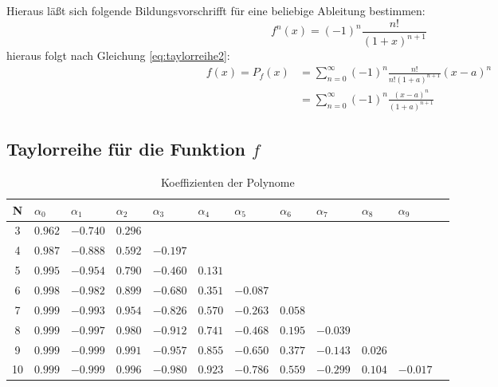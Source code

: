 \documentclass{beamer}
\begin{document}
  \begin{frame}
    Hieraus läßt sich folgende Bildungsvorschrifft für eine beliebige Ableitung bestimmen:
    \begin{equation}
        f^n\left(x\right) = \left(-1\right)^n \frac{n!}{\left(1+x\right)^{n+1}}
    \end{equation}
    hieraus folgt nach Gleichung \ref{eq:taylorreihe2}:
    \begin{align}
        f\left(x\right)  =  P_f\left(x\right) 
                        &= \sum_{n=0}^{\infty} \left(-1\right)^n
                            \frac{n!}{n!\left(1+a\right)^{n+1}}\left(x-a\right)^n\\
                        &=  \sum_{n=0}^{\infty} \left(-1\right)^n
                            \frac{\left(x-a\right)^n}{\left(1+a\right)^{n+1}}
    \end{align}
  \end{frame}
    
  \subsection{Taylorreihe für die Funktion $f$}
  \begin{frame}
    \centering    
    \begin{table}[htbp]
    \tiny   
    \renewcommand{\arraystretch}{1.5}
    \begin{tabularx}{\textwidth}{|c|X|X|X|X|X|X|X|X|X|X|X|}
        \hline    
        N & $\alpha_0$&$\alpha_1$&$\alpha_2$&$\alpha_3$&$\alpha_4$&$\alpha_5$&$\alpha_6$&$\alpha_7$&$\alpha_8$&$\alpha_9$\\\hline
        3 & $0.962$ & $-0.740$ & $0.296$ &&&&&&& \\\hline
        4 & $0.987$ & $-0.888$ & $0.592$ & $-0.197$ &&&&&& \\\hline
        5 & $0.995$ & $-0.954$ & $0.790$ & $-0.460$ & $0.131$ &&&&& \\\hline
        6 & $0.998$ & $-0.982$ & $0.899$ & $-0.680$ & $0.351$ & $-0.087$ &&&& \\\hline
        7 & $0.999$ & $-0.993$ & $0.954$ & $-0.826$ & $0.570$ & $-0.263$ & $0.058$ &&& \\\hline
        8 & $0.999$ & $-0.997$ & $0.980$ & $-0.912$ & $0.741$ & $-0.468$ & $0.195$ & $-0.039$ && \\\hline
        9 & $0.999$ & $-0.999$ & $0.991$ & $-0.957$ & $0.855$ & $-0.650$ & $0.377$ & $-0.143$ & $0.026$ & \\\hline
        10& $0.999$ & $-0.999$ & $0.996$ & $-0.980$ & $0.923$ & $-0.786$ & $0.559$ & $-0.299$ & $0.104$ & $-0.017$ \\\hline
    \end{tabularx}
    \caption{Koeffizienten der Polynome}      
    \end{table}
  \end{frame}
  
\end{document}
